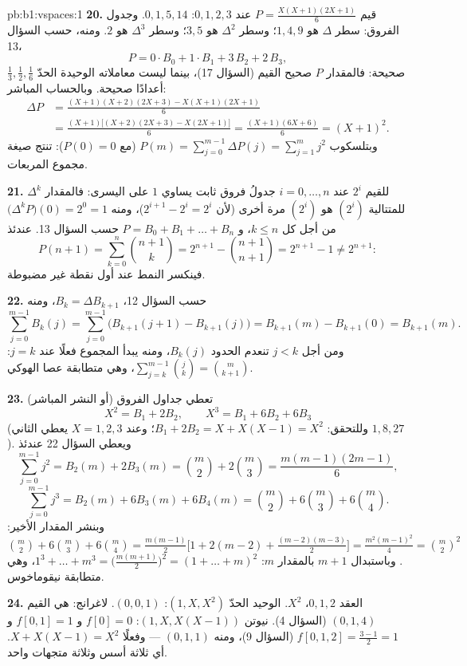 \begin{solution}{pb:b1:vspaces:1}
\textbf{20.} قيم $P = \frac{X(X+1)(2X+1)}{6}$ عند $0,1,2,3$:
$0, 1, 5, 14$. وجدول الفروق: سطر $\Delta$ هو $1, 4, 9$؛
وسطر $\Delta^2$ هو $3, 5$؛ وسطر $\Delta^3$ هو $2$. ومنه، حسب السؤال 13،
\[
P = 0\cdot B_0 + 1\cdot B_1 + 3\,B_2 + 2\,B_3 ,
\]
 صحيحة: فالمقدار $P$ صحيح القيم (السؤال 17)،
بينما ليست معاملاته الوحيدة الحدّ $\frac13, \frac12, \frac16$
أعدادًا صحيحة. وبالحساب المباشر:
\begin{align*}
\Delta P &= \frac{(X+1)(X+2)(2X+3) - X(X+1)(2X+1)}{6} \\
&= \frac{(X+1)\bigl[(X+2)(2X+3) - X(2X+1)\bigr]}{6}
= \frac{(X+1)(6X+6)}{6} = (X+1)^2 .
\end{align*}
وبتلسكوب $P(m) = \sum_{j=0}^{m-1}\Delta P(j) = \sum_{j=1}^{m}
j^2$ (مع $P(0) = 0$): تنتج صيغة مجموع المربعات.

\textbf{21.} للقيم $2^i$ عند $i = 0, \dots, n$ جدولُ فروق
ثابت يساوي $1$ على  اليسرى: فالمقدار $\Delta^k$ للمتتالية
$(2^i)$ هو $(2^i)$ مرة أخرى (لأن $2^{i+1} - 2^i = 2^i$)، ومنه
$\bigl(\Delta^k P\bigr)(0) = 2^0 = 1$ من أجل كل $k \leq n$، و $P =
B_0 + B_1 + \dots + B_n$ حسب السؤال 13. عندئذ
\[
P(n+1) = \sum_{k=0}^{n}\binom{n+1}{k}
= 2^{n+1} - \binom{n+1}{n+1} = 2^{n+1} - 1 \neq 2^{n+1}:
\]
فينكسر النمط عند أول نقطة غير مضبوطة.

\textbf{22.} حسب السؤال 12، $B_k = \Delta B_{k+1}$، ومنه
\[
\sum_{j=0}^{m-1} B_k(j)
= \sum_{j=0}^{m-1}\bigl(B_{k+1}(j+1) - B_{k+1}(j)\bigr)
= B_{k+1}(m) - B_{k+1}(0) = B_{k+1}(m).
\]
ومن أجل $j < k$ تنعدم الحدود $B_k(j)$، ومنه يبدأ المجموع فعلًا عند
$j = k$: $\sum_{j=k}^{m-1}\binom jk = \binom m{k+1}$، وهي
متطابقة عصا الهوكي.

\textbf{23.} تعطي جداول الفروق (أو النشر المباشر)
\[
X^2 = B_1 + 2 B_2, \qquad X^3 = B_1 + 6 B_2 + 6 B_3
\]
(وللتحقق: $B_1 + 2B_2 = X + X(X-1) = X^2$؛ وعند $X = 1, 2, 3$ يعطي
الثاني $1, 8, 27$). ويعطي السؤال 22 عندئذ
\[
\sum_{j=0}^{m-1} j^2 = B_2(m) + 2B_3(m)
= \binom m2 + 2\binom m3 = \frac{m(m-1)(2m-1)}{6},
\]
\[
\sum_{j=0}^{m-1} j^3 = B_2(m) + 6B_3(m) + 6B_4(m)
= \binom m2 + 6\binom m3 + 6\binom m4 .
\]
وبنشر المقدار الأخير: $\binom m2 + 6\binom m3 + 6\binom
m4 = \frac{m(m-1)}{2}\bigl[1 + 2(m-2) +
\frac{(m-2)(m-3)}{2}\bigr] = \frac{m^2(m-1)^2}{4} = \binom m2^2$.
وباستبدال $m + 1$ بالمقدار $m$: $1^3 + \dots + m^3 =
\bigl(\frac{m(m+1)}2\bigr)^2 = (1 + \dots + m)^2$، وهي متطابقة
نيقوماخوس.

\textbf{24.} العقد $0, 1, 2$،  $X^2$.  الوحيد الحدّ
$(1, X, X^2)$:  $(0, 0, 1)$.  لاغرانج:
 هي القيم $(0, 1, 4)$ (السؤال 4).  نيوتن
$(1, X, X(X-1))$:  $f[0] = 0$ و $f[0,1] = 1$ و
$f[0,1,2] = \frac{3 - 1}{2} = 1$ (السؤال 9)، ومنه 
$(0, 1, 1)$ --- وفعلًا $X + X(X-1) = X^2$. أي ثلاثة أسس وثلاثة
متجهات   واحد.


\end{solution}
